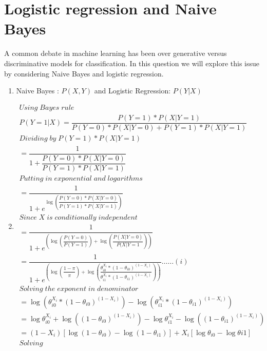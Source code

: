 \section{Logistic regression and Naive Bayes }

A common debate in machine learning has been over generative versus
discriminative models for classification.  In this question we will
explore this issue by considering Naive Bayes and logistic regression.

\begin{enumerate}
\item Naive Bayes : $P(X,Y)$ and Logistic Regression: $P(Y|X)$


\item 
\begin{align*}
	Using \; Bayes\; rule \\
	P(Y=1|X) =\dfrac{P (Y=1) * P(X | Y=1)}{P(Y=0) * P(X | Y =0) + P(Y=1)*P(X|Y=1)} \\
	Dividing \; by \; {P (Y=1) * P(X | Y=1)}\\
	= \dfrac{1}{1 + \dfrac{P(Y=0) * P(X | Y =0)} {P (Y=1) * P(X | Y=1)} } \\
	Putting \; in\; exponential \; and \; logarithms\\
	= \dfrac{1}{1 + e^{\log\left({\dfrac{P(Y=0) * P(X | Y =0)} {P (Y=1) * P(X | Y=1)} }\right)}} \\
	Since \;X \;is\; conditionally\; independent \\
	= \dfrac{1}{1 + e^{\left(\log{\left(\dfrac{P(Y=0)} {P (Y=1)}\right)} + \log {\left(\dfrac{P(X | Y=0)}{P(X | Y=1} \right)}\right)}} \\
	= \dfrac{1}{1 + e^{\left(\log{\left(\dfrac{1-\pi} {\pi}\right)} + \log {\left(\dfrac{\theta_{i0}^{X_i}*(1-\theta_{i0})^{(1-X_i)}}{\theta_{i1}^{X_i}*(1-\theta_{i1})^{(1-X_i)}} \right)}\right)}} \ldots\ldots (i)\\
	Solving \;the\; exponent \; in \; denominator \\
	= \log{\left(\theta_{i0}^{X_i} * (1-\theta_{i0})^{(1-X_i)} \right)} - \log{\left(\theta_{i1}^{X_i} * (1-\theta_{i1})^{(1-X_i)} \right)}\\
	= \log{\theta_{i0}^{X_i}} + \log{\left((1-\theta_{i0})^{(1-X_i)}\right)} - \log{\theta_{i1}^{X_i}} - \log{\left((1-\theta_{i1})^{(1-X_i)}\right)}\\
	= (1-X_i) \left[  \log{(1-\theta_{i0})} - \log{(1-\theta_{i1})} \right] + {X_i}\left[ \log{\theta_{i0}} -\log{\theta{i1}}    \right]\\
	Solving\; \\

\end{align*}
\end{enumerate}
